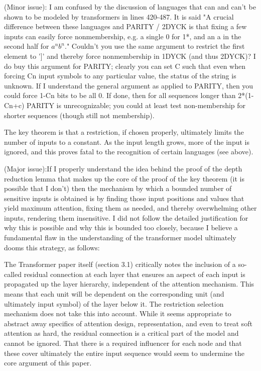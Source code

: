 \documentclass[11pt,a4paper]{article}
\newcounter{theorem}
\begin{document}
(Minor issue): I am confused by the discussion of languages that can and
can't be
shown to be modeled by transformers in lines 420-487. It is said "A
crucial difference between these languages and PARITY / 2DYCK is that
fixing a few inputs can easily force nonmembership, e.g. a single 0
for 1*, and an a in the second half for $a^n b^n$." Couldn't you use the
same argument to restrict the first element to ']' and thereby force
nonmembership in 1DYCK (and thus 2DYCK)? I do buy this
argument for PARITY; clearly you can set C such that even when forcing
Cn input symbols to any particular value, the status of the string is
unknown. If I understand the general argument as applied to PARITY,
then you could force 1-Cn bits to be all 0. If done, then for all
sequences longer than 2*(1-Cn+c) PARITY is unrecognizable; you could
at least test non-membership for shorter sequences (though still not
membership).

The key theorem is that a restriction, if chosen properly, ultimately
limits the number of inputs to a constant. As the input length grows,
more of the input is ignored, and this proves fatal to the recognition
of certain languages (see above).


(Major issue):If I properly understand the idea behind the proof of the
depth reduction lemma
that makes up the core of the proof of the key theorem (it is possible
that I don't) then the mechanism by which a bounded number of
sensitive inputs is obtained is by finding those input positions and
values that yield maximum attention, fixing them as needed, and
thereby overwhelming other inputs, rendering them insensitive. I did
not follow the detailed justification for why this is possible and why
this is bounded too closely, because I believe a fundamental flaw in
the understanding of the transformer model ultimately dooms this
strategy, as follows:

The Transformer paper itself (section 3.1) critically notes the
inclusion of a so-called residual connection
at each layer that ensures an aspect of each input is propagated up the
layer
hierarchy, independent of the attention mechanism. This means that
each unit will be dependent on the corresponding unit (and ultimately
input symbol) of the layer below it. The restriction selection
mechanism does not take this into account. While it seems appropriate to
abstract away specifics of attention design, representation, and even
to treat soft attention as hard, the residual connection is a critical part
of the model and cannot be ignored. That there is a required
influencer for each node and that these cover ultimately the entire
input sequence would seem to undermine the core argument of this paper.
\end{document}

